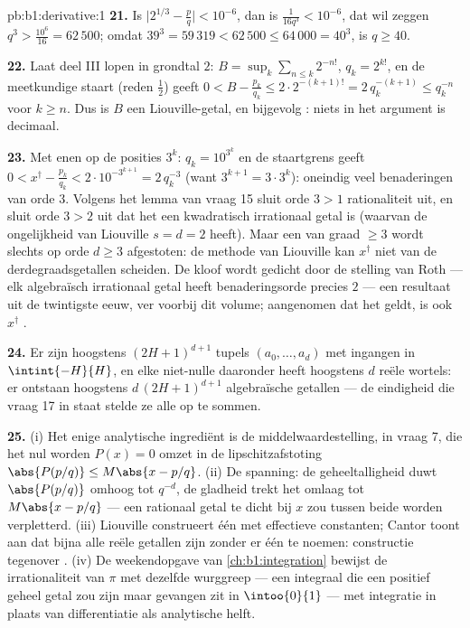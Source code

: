 \begin{solution}{pb:b1:derivative:1}
\textbf{21.} Is $\bigl|2^{1/3} - \frac pq\bigr| < 10^{-6}$, dan
is $\frac{1}{16 q^3} < 10^{-6}$, dat wil zeggen $q^3 >
\frac{10^6}{16} = 62\,500$; omdat $39^3 = 59\,319 < 62\,500 \leq
64\,000 = 40^3$, is $q \geq 40$.

\textbf{22.} Laat deel III lopen in grondtal $2$: $B = \sup_k
\sum_{n\leq k} 2^{-n!}$, $q_k = 2^{k!}$, en de meetkundige staart
(reden $\frac12$) geeft $0 < B - \frac{p_k}{q_k} \leq
2\cdot2^{-(k+1)!} = 2\,q_k^{-(k+1)} \leq q_k^{-n}$ voor $k \geq
n$. Dus is $B$ een Liouville-getal, en bijgevolg :
niets in het argument is decimaal.

\textbf{23.} Met enen op de posities $3^k$: $q_k = 10^{3^k}$ en
de staartgrens geeft $0 < x^\dagger - \frac{p_k}{q_k} <
2\cdot10^{-3^{k+1}} = 2\,q_k^{-3}$ (want $3^{k+1} = 3\cdot3^k$):
oneindig veel benaderingen van orde $3$. Volgens het lemma van
vraag 15 sluit orde $3 > 1$ rationaliteit uit, en sluit orde $3 >
2$ uit dat het een kwadratisch irrationaal getal is (waarvan de
ongelijkheid van Liouville $s = d = 2$ heeft). Maar een
 van graad $\geq 3$ wordt slechts op orde $d
\geq 3$ afgestoten: de methode van Liouville kan $x^\dagger$ niet
van de derdegraadsgetallen scheiden. De kloof wordt gedicht door
de stelling van Roth --- elk algebraïsch irrationaal getal heeft
benaderingsorde precies $2$ --- een resultaat uit de twintigste
eeuw, ver voorbij dit volume; aangenomen dat het geldt, is ook
$x^\dagger$ .

\textbf{24.} Er zijn hoogstens $(2H+1)^{d+1}$ tupels $(a_0,
\dots, a_d)$ met ingangen in $\intint{-H}{H}$, en elke niet-nulle
 daaronder heeft hoogstens $d$ reële wortels: er ontstaan
hoogstens $d\,(2H+1)^{d+1}$ algebraïsche getallen --- de
eindigheid die vraag 17 in staat stelde ze alle op te sommen.

\textbf{25.} (i) Het enige analytische ingrediënt is de
middelwaardestelling, in vraag 7, die het nul worden $P(x) = 0$
omzet in de lipschitzafstoting $\abs{P(p/q)} \leq M\abs{x -
p/q}$. (ii) De spanning: de geheeltalligheid duwt $\abs{P(p/q)}$
omhoog tot $q^{-d}$, de gladheid trekt het omlaag tot $M\abs{x -
p/q}$ --- een rationaal getal te dicht bij $x$ zou tussen beide
worden verpletterd. (iii) Liouville construeert één  met effectieve constanten; Cantor toont aan dat bijna alle
reële getallen  zijn zonder er één te noemen:
constructie tegenover . (iv) De weekendopgave van
\cref{ch:b1:integration} bewijst de irrationaliteit van $\pi$ met
dezelfde wurggreep --- een integraal die een positief geheel
getal zou zijn maar gevangen zit in $\intoo{0}{1}$ --- met
integratie in plaats van differentiatie als analytische helft.
\end{solution}
